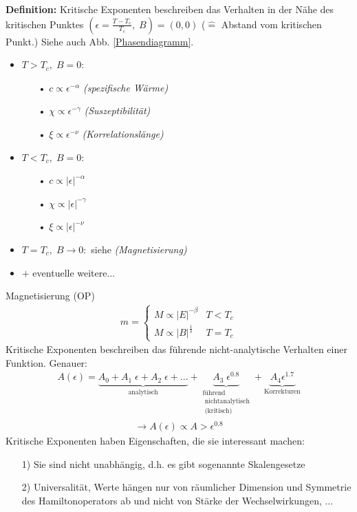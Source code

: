 \documentclass[12pt]{article}
\begin{document}
\textbf{Definition:} Kritische Exponenten beschreiben das Verhalten in der Nähe des kritischen Punktes $(\epsilon = \frac{T - T_c}{T_c} , \;  B) = (0,0)$  ($\widehat{=}$ Abstand vom kritischen Punkt.) Siehe auch Abb. \ref{Phasendiagramm}.
\begin{itemize}
\item $T>T_c, \; B=0 : $ 
\begin{itemize}
\item[•] $c \propto \epsilon^{-\alpha}$ \textit{(spezifische Wärme)}
\item[•] $\chi \propto \epsilon^{-\gamma}$ \textit{(Suszeptibilität)}
\item[•]$\xi \propto \epsilon^{-\nu}$ \textit{(Korrelationslänge)}
\end{itemize}

\item $T<T_c, \; B=0 :$
\begin{itemize}
\item[•] $c \propto \vert \epsilon \vert ^{-\alpha}$ 
\item[•] $\chi \propto \vert \epsilon \vert ^{-\gamma}$
\item[•]$\xi \propto \vert \epsilon \vert ^{-\nu}$ 
\end{itemize}

\item $T=T_c, \; B \to 0:$ siehe \textit{(Magnetisierung)}

\item $+$ eventuelle weitere...
\end{itemize}
  
Magnetisierung (OP) \begin{align}
m= \begin{cases}
M \propto \vert E \vert ^{-\beta} & T<T_c \\
M \propto \vert B \vert ^\frac{1}{\delta} & T=T_c
\end{cases}
\end{align}
Kritische Exponenten beschreiben das führende nicht-analytische Verhalten einer Funktion. Genauer:
\begin{align*}
A(\epsilon)= 
\underbrace{ A_0 + A_1\;  \epsilon + A_2 \; \epsilon +...}_\text{analytisch} 
+ \underbrace{ A_3 \; \epsilon^{0.8}}_{\substack{ \text{führend} \\ \text{ nichtanalytisch} \\ \text{ (kritisch)} }}
+ \underbrace{ A_4 \epsilon^{1.7}}_\text{Korrekturen}
\end{align*}
\begin{align*}
\to A(\epsilon ) \propto A > \epsilon^{0.8}
\end{align*}
Kritische Exponenten haben Eigenschaften, die sie interessant machen:
\begin{enumerate}
\item[1)] Sie sind nicht unabhängig, d.h. es gibt sogenannte Skalengesetze %
\item[2)] Universalität, Werte hängen nur von räumlicher Dimension und Symmetrie des Hamiltonoperators ab und nicht von Stärke der Wechselwirkungen, ...
\end{enumerate}
\end{document}
